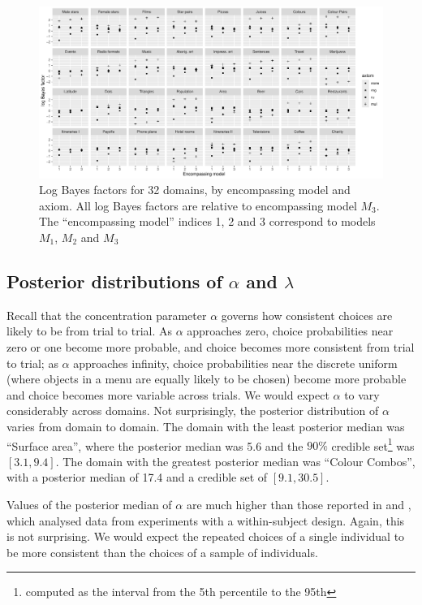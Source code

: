 \documentclass[11pt,letter]{article}
\begin{document}
\begin{figure}
	\begin{center}
	\includegraphics[width=16cm]{multiple_BF}
	\caption{Log Bayes factors for 32 domains, by encompassing model and axiom. All log Bayes factors are relative to encompassing model $M_3$. The ``encompassing model'' indices 1, 2 and 3 correspond to models $M_1$, $M_2$ and $M_3$}\label{f:multiple_BF}
	\end{center}
\end{figure}

\subsection{Posterior distributions of $\alpha$ and $\lambda$}

Recall that the concentration parameter $\alpha$ governs how consistent choices are likely to be from trial to trial.
As $\alpha$ approaches zero, choice probabilities near zero or one become more probable, and choice becomes more consistent from trial to trial; as $\alpha$ approaches infinity, choice probabilities near the discrete uniform (where objects in a menu are equally likely to be chosen) become more probable and choice becomes more variable across trials.
We would expect $\alpha$ to vary considerably across domains.
Not surprisingly, the posterior distribution of $\alpha$ varies from domain to domain.
The domain with the least posterior median was ``Surface area'', where the posterior median was 5.6 and the $90\%$ credible set\footnote{computed as the interval from the 5th percentile to the 95th} was $[3.1,9.4]$.
The domain with the greatest posterior median was ``Colour Combos'', with a posterior median of 17.4 and a credible set of $[9.1,30.5]$.

Values of the posterior median of $\alpha$ are much higher than those reported in  and , which analysed data from experiments with a within-subject design.
Again, this is not surprising.
We would expect the repeated choices of a single individual to be more consistent than the choices of a sample of individuals.
\end{document}
